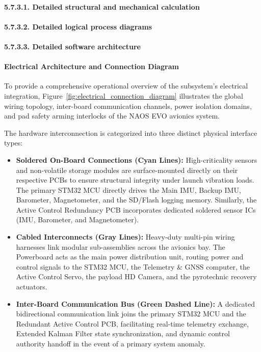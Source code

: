 \documentclass[11pt, a4paper]{article} %
\begin{document}
\paragraph{5.7.3.1. Detailed structural and mechanical calculation}
\paragraph{5.7.3.2. Detailed logical process diagrams}
\paragraph{5.7.3.3. Detailed software architecture} 
\paragraph{Electrical Architecture and Connection Diagram}
\label{para:electrical_diagram}
To provide a comprehensive operational overview of the subsystem's electrical integration, Figure~\ref{fig:electrical_connection_diagram} illustrates the global wiring topology, inter-board communication channels, power isolation domains, and pad safety arming interlocks of the NAOS EVO avionics system.

The hardware interconnection is categorized into three distinct physical interface types:
\begin{itemize}
    \item \textbf{Soldered On-Board Connections (Cyan Lines):} High-criticality sensors and non-volatile storage modules are surface-mounted directly on their respective PCBs to ensure structural integrity under launch vibration loads. The primary STM32 MCU directly drives the Main IMU, Backup IMU, Barometer, Magnetometer, and the SD/Flash logging memory. Similarly, the Active Control Redundancy PCB incorporates dedicated soldered sensor ICs (IMU, Barometer, and Magnetometer).
    \item \textbf{Cabled Interconnects (Gray Lines):} Heavy-duty multi-pin wiring harnesses link modular sub-assemblies across the avionics bay. The Powerboard acts as the main power distribution unit, routing power and control signals to the STM32 MCU, the Telemetry \& GNSS computer, the Active Control Servo, the payload HD Camera, and the pyrotechnic recovery actuators.
    \item \textbf{Inter-Board Communication Bus (Green Dashed Line):} A dedicated bidirectional communication link joins the primary STM32 MCU and the Redundant Active Control PCB, facilitating real-time telemetry exchange, Extended Kalman Filter state synchronization, and dynamic control authority handoff in the event of a primary system anomaly.
\end{itemize}
\end{document}
